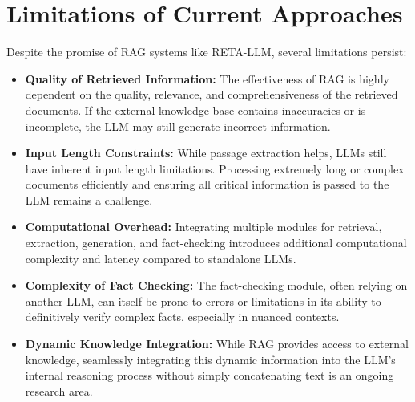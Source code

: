 \documentclass{article}
\begin{document}
\section{Limitations of Current Approaches}
Despite the promise of RAG systems like RETA-LLM, several limitations persist:
\begin{itemize}
    \item \textbf{Quality of Retrieved Information:} The effectiveness of RAG is highly dependent on the quality, relevance, and comprehensiveness of the retrieved documents. If the external knowledge base contains inaccuracies or is incomplete, the LLM may still generate incorrect information.
    \item \textbf{Input Length Constraints:} While passage extraction helps, LLMs still have inherent input length limitations. Processing extremely long or complex documents efficiently and ensuring all critical information is passed to the LLM remains a challenge.
    \item \textbf{Computational Overhead:} Integrating multiple modules for retrieval, extraction, generation, and fact-checking introduces additional computational complexity and latency compared to standalone LLMs.
    \item \textbf{Complexity of Fact Checking:} The fact-checking module, often relying on another LLM, can itself be prone to errors or limitations in its ability to definitively verify complex facts, especially in nuanced contexts.
    \item \textbf{Dynamic Knowledge Integration:} While RAG provides access to external knowledge, seamlessly integrating this dynamic information into the LLM's internal reasoning process without simply concatenating text is an ongoing research area.
\end{itemize}
\end{document}
